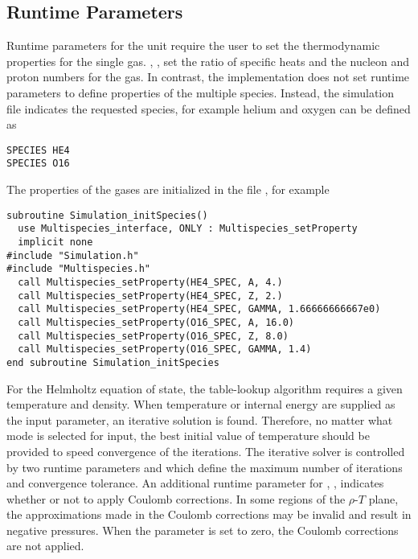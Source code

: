 \subsection{Runtime Parameters}
\label{Sec:Eos Runtime Parameters}
Runtime parameters for the  unit require the user to set the
thermodynamic properties for the single gas.  ,
,  set the ratio of specific
heats and the nucleon and proton numbers for the gas.  In contrast, the
 implementation does not set runtime parameters to define
properties of the multiple species.  Instead, the simulation  file
indicates the requested species, for example helium and oxygen can be defined as
\begin{center}
\begin{verbatim}
SPECIES HE4
SPECIES O16
\end{verbatim}
\end{center}
The properties of the gases are initialized in the file ,
for example
\begin{center}
\begin{verbatim}
subroutine Simulation_initSpecies()
  use Multispecies_interface, ONLY : Multispecies_setProperty
  implicit none
#include "Simulation.h"
#include "Multispecies.h"
  call Multispecies_setProperty(HE4_SPEC, A, 4.)
  call Multispecies_setProperty(HE4_SPEC, Z, 2.)
  call Multispecies_setProperty(HE4_SPEC, GAMMA, 1.66666666667e0)
  call Multispecies_setProperty(O16_SPEC, A, 16.0)
  call Multispecies_setProperty(O16_SPEC, Z, 8.0)
  call Multispecies_setProperty(O16_SPEC, GAMMA, 1.4)
end subroutine Simulation_initSpecies
\end{verbatim}
\end{center}


For the Helmholtz equation of state, the table-lookup algorithm requires
a given temperature and density. When temperature or internal energy are supplied
as the input parameter, an iterative solution is found.
Therefore, no matter what mode is selected for  input, the best
 initial value of temperature should be provided to speed convergence of the iterations.
The iterative solver is controlled by two runtime parameters  and
 which define the maximum number of iterations
and convergence tolerance.
An additional runtime parameter for , ,
indicates whether or not to apply Coulomb corrections. In some
regions of the $\rho$-$T$ plane, the approximations made in the
Coulomb corrections may be invalid and result in negative pressures.
When the parameter  is set to zero,
the Coulomb corrections are not applied.

